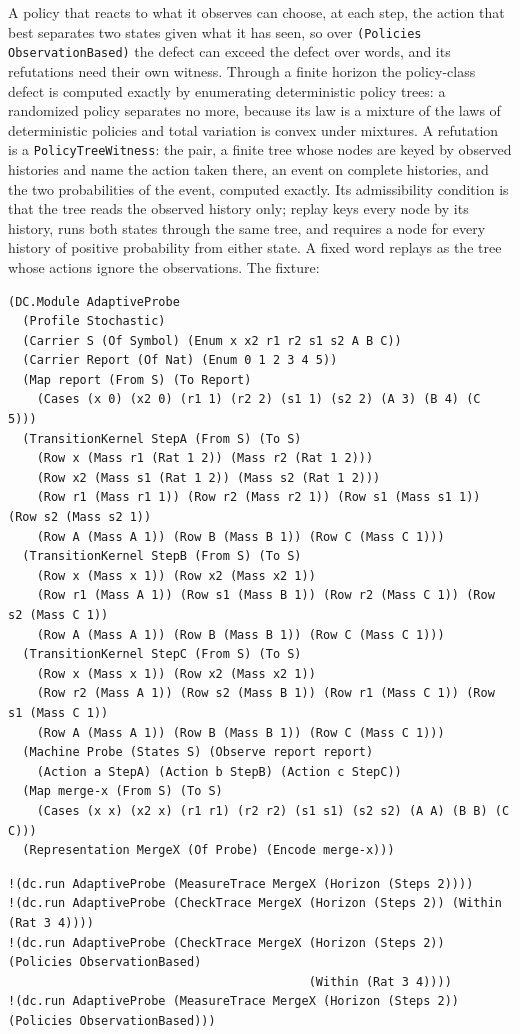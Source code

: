 \documentclass[11pt]{article}
\newcommand{\code}[1]{\texttt{#1}}
\theoremstyle{definition}
\theoremstyle{plain}
\begin{document}
A policy that reacts to what it observes can choose, at each step, the action that best separates
two states given what it has seen, so over \code{(Policies ObservationBased)} the defect can exceed
the defect over words, and its refutations need their own witness. Through a finite horizon the policy-class defect is computed exactly by
enumerating deterministic policy trees: a randomized policy separates no more, because its law is a
mixture of the laws of deterministic policies and total variation is convex under mixtures. A
refutation is a \code{PolicyTreeWitness}: the pair, a finite tree whose nodes are keyed by observed
histories and name the action taken there, an event on complete histories, and the two
probabilities of the event, computed exactly. Its admissibility condition is that the tree reads the
observed history only; replay keys every node by its history, runs both states through the same
tree, and requires a node for every history of positive probability from either state. A fixed
word replays as the tree whose actions ignore the observations. The fixture:
\begin{lstlisting}[basicstyle=\ttfamily\footnotesize,title={\scriptsize\ttfamily fixtures/certificate\_limits.metta}]
(DC.Module AdaptiveProbe
  (Profile Stochastic)
  (Carrier S (Of Symbol) (Enum x x2 r1 r2 s1 s2 A B C))
  (Carrier Report (Of Nat) (Enum 0 1 2 3 4 5))
  (Map report (From S) (To Report)
    (Cases (x 0) (x2 0) (r1 1) (r2 2) (s1 1) (s2 2) (A 3) (B 4) (C 5)))
  (TransitionKernel StepA (From S) (To S)
    (Row x (Mass r1 (Rat 1 2)) (Mass r2 (Rat 1 2)))
    (Row x2 (Mass s1 (Rat 1 2)) (Mass s2 (Rat 1 2)))
    (Row r1 (Mass r1 1)) (Row r2 (Mass r2 1)) (Row s1 (Mass s1 1)) (Row s2 (Mass s2 1))
    (Row A (Mass A 1)) (Row B (Mass B 1)) (Row C (Mass C 1)))
  (TransitionKernel StepB (From S) (To S)
    (Row x (Mass x 1)) (Row x2 (Mass x2 1))
    (Row r1 (Mass A 1)) (Row s1 (Mass B 1)) (Row r2 (Mass C 1)) (Row s2 (Mass C 1))
    (Row A (Mass A 1)) (Row B (Mass B 1)) (Row C (Mass C 1)))
  (TransitionKernel StepC (From S) (To S)
    (Row x (Mass x 1)) (Row x2 (Mass x2 1))
    (Row r2 (Mass A 1)) (Row s2 (Mass B 1)) (Row r1 (Mass C 1)) (Row s1 (Mass C 1))
    (Row A (Mass A 1)) (Row B (Mass B 1)) (Row C (Mass C 1)))
  (Machine Probe (States S) (Observe report report)
    (Action a StepA) (Action b StepB) (Action c StepC))
  (Map merge-x (From S) (To S)
    (Cases (x x) (x2 x) (r1 r1) (r2 r2) (s1 s1) (s2 s2) (A A) (B B) (C C)))
  (Representation MergeX (Of Probe) (Encode merge-x)))
\end{lstlisting}
\begin{lstlisting}[basicstyle=\ttfamily\footnotesize,title={\scriptsize\ttfamily fixtures/certificate\_limits.metta}]
!(dc.run AdaptiveProbe (MeasureTrace MergeX (Horizon (Steps 2))))
!(dc.run AdaptiveProbe (CheckTrace MergeX (Horizon (Steps 2)) (Within (Rat 3 4))))
!(dc.run AdaptiveProbe (CheckTrace MergeX (Horizon (Steps 2)) (Policies ObservationBased)
                                          (Within (Rat 3 4))))
!(dc.run AdaptiveProbe (MeasureTrace MergeX (Horizon (Steps 2)) (Policies ObservationBased)))
\end{lstlisting}
\end{document}
